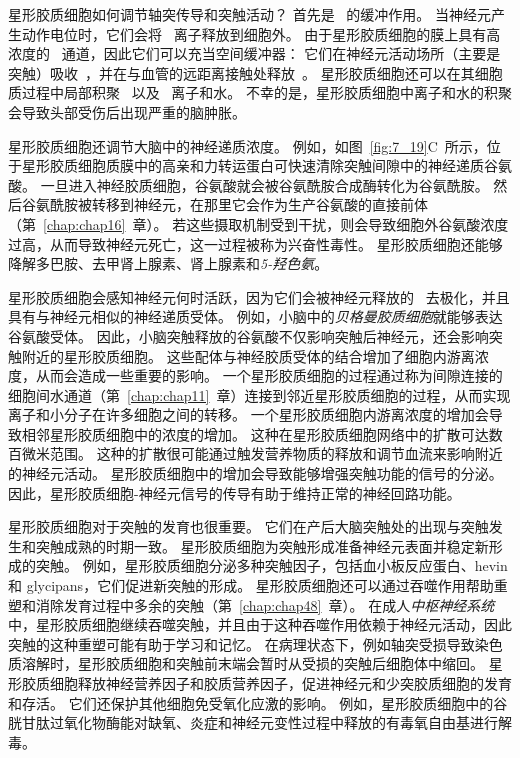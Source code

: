 星形胶质细胞如何调节轴突传导和突触活动？
首先是~ 的缓冲作用。
当神经元产生动作电位时，它们会将~ 离子释放到细胞外。
由于星形胶质细胞的膜上具有高浓度的~ 通道，因此它们可以充当空间缓冲器：
它们在神经元活动场所（主要是突触）吸收~，并在与血管的远距离接触处释放~。
星形胶质细胞还可以在其细胞质过程中局部积聚~ 以及~ 离子和水。
不幸的是，星形胶质细胞中离子和水的积聚会导致头部受伤后出现严重的脑肿胀。


星形胶质细胞还调节大脑中的神经递质浓度。
例如，如图~\ref{fig:7_19}C~所示，位于星形胶质细胞质膜中的高亲和力转运蛋白可快速清除突触间隙中的神经递质谷氨酸。
一旦进入神经胶质细胞，谷氨酸就会被谷氨酰胺合成酶转化为谷氨酰胺。
然后谷氨酰胺被转移到神经元，在那里它会作为生产谷氨酸的直接前体（第~\ref{chap:chap16}~章）。
若这些摄取机制受到干扰，则会导致细胞外谷氨酸浓度过高，从而导致神经元死亡，这一过程被称为兴奋性毒性。
星形胶质细胞还能够降解多巴胺、去甲肾上腺素、肾上腺素和\textit{5-羟色氨}。


星形胶质细胞会感知神经元何时活跃，因为它们会被神经元释放的~ 去极化，并且具有与神经元相似的神经递质受体。
例如，小脑中的\textit{贝格曼胶质细胞}就能够表达谷氨酸受体。
因此，小脑突触释放的谷氨酸不仅影响突触后神经元，还会影响突触附近的星形胶质细胞。
这些配体与神经胶质受体的结合增加了细胞内游离浓度，从而会造成一些重要的影响。
一个星形胶质细胞的过程通过称为间隙连接的细胞间水通道（第~\ref{chap:chap11}~章）连接到邻近星形胶质细胞的过程，从而实现离子和小分子在许多细胞之间的转移。
一个星形胶质细胞内游离浓度的增加会导致相邻星形胶质细胞中的浓度的增加。
这种在星形胶质细胞网络中的扩散可达数百微米范围。
这种的扩散很可能通过触发营养物质的释放和调节血流来影响附近的神经元活动。
星形胶质细胞中的增加会导致能够增强突触功能的信号的分泌。
因此，星形胶质细胞-神经元信号的传导有助于维持正常的神经回路功能。


星形胶质细胞对于突触的发育也很重要。
它们在产后大脑突触处的出现与突触发生和突触成熟的时期一致。
星形胶质细胞为突触形成准备神经元表面并稳定新形成的突触。
例如，星形胶质细胞分泌多种突触因子，包括血小板反应蛋白、hevin 和 glycipans，它们促进新突触的形成。
星形胶质细胞还可以通过吞噬作用帮助重塑和消除发育过程中多余的突触（第~\ref{chap:chap48}~章）。
在成人\textit{中枢神经系统}中，星形胶质细胞继续吞噬突触，并且由于这种吞噬作用依赖于神经元活动，因此突触的这种重塑可能有助于学习和记忆。
在病理状态下，例如轴突受损导致染色质溶解时，星形胶质细胞和突触前末端会暂时从受损的突触后细胞体中缩回。
星形胶质细胞释放神经营养因子和胶质营养因子，促进神经元和少突胶质细胞的发育和存活。
它们还保护其他细胞免受氧化应激的影响。
例如，星形胶质细胞中的谷胱甘肽过氧化物酶能对缺氧、炎症和神经元变性过程中释放的有毒氧自由基进行解毒。


